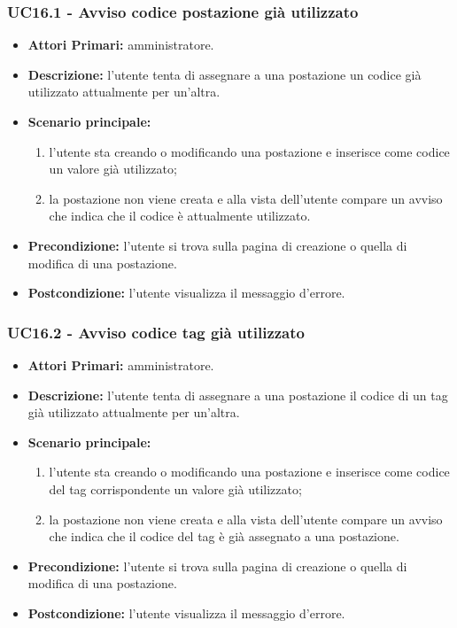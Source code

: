 \subsubsection{UC16.1 - Avviso codice postazione già utilizzato}
\begin{itemize}
	\item\textbf{Attori Primari:}
	amministratore.
	\item\textbf{Descrizione:}
	l'utente tenta di assegnare a una postazione un codice già utilizzato attualmente per un'altra.
	\item\textbf{Scenario principale:}
	\begin{enumerate}
		\item l'utente sta creando o modificando una postazione e inserisce come codice un valore già utilizzato;
		\item la postazione non viene creata e alla vista dell'utente compare un avviso che indica che il codice è attualmente utilizzato.
	\end{enumerate}
	\item\textbf{Precondizione:}
	l'utente si trova sulla pagina di creazione o quella di modifica di una postazione.
	\item\textbf{Postcondizione:}
	l'utente visualizza il messaggio d'errore.
\end{itemize}

\subsubsection{UC16.2 - Avviso codice tag già utilizzato}
\begin{itemize}
	\item\textbf{Attori Primari:}
	amministratore.
	\item\textbf{Descrizione:}
	l'utente tenta di assegnare a una postazione il codice di un tag già utilizzato attualmente per un'altra.
	\item\textbf{Scenario principale:}
	\begin{enumerate}
		\item l'utente sta creando o modificando una postazione e inserisce come codice del tag corrispondente un valore già utilizzato;
		\item la postazione non viene creata e alla vista dell'utente compare un avviso che indica che il codice del tag è già assegnato a una postazione.
	\end{enumerate}
	\item\textbf{Precondizione:}
	l'utente si trova sulla pagina di creazione o quella di modifica di una postazione.
	\item\textbf{Postcondizione:}
	l'utente visualizza il messaggio d'errore.
\end{itemize}

